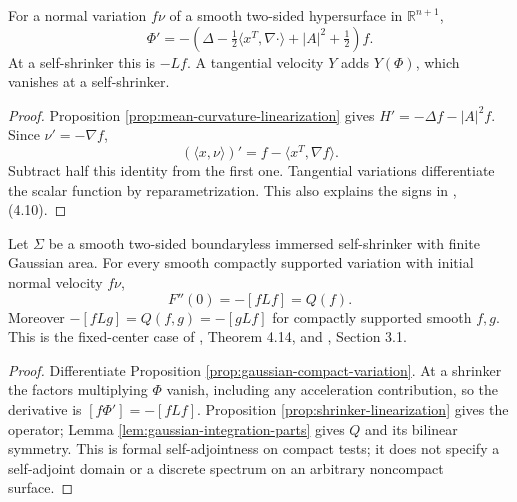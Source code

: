 \begin{proposition}\label{prop:shrinker-linearization}
For a normal variation $f\nu$ of a smooth two-sided hypersurface in $\mathbb R^{n+1}$,
\[
 \Phi'= -\left(\Delta-\tfrac12\langle x^T,\nabla\cdot\rangle+|A|^2+\tfrac12\right)f.
\]
At a self-shrinker this is $-Lf$. A tangential velocity $Y$ adds $Y(\Phi)$, which vanishes at a self-shrinker.
\end{proposition}
\begin{proof}
Proposition \ref{prop:mean-curvature-linearization} gives $H'=-\Delta f-|A|^2f$. Since $\nu'=-\nabla f$,
\[
 (\langle x,\nu\rangle)'=f-\langle x^T,\nabla f\rangle.
\]
Subtract half this identity from the first one. Tangential variations differentiate the scalar function by reparametrization. This also explains the signs in \cite{CM12}, (4.10).
\end{proof}

\begin{theorem}\label{thm:shrinker-fixed-hessian}
Let $\Sigma$ be a smooth two-sided boundaryless immersed self-shrinker with finite Gaussian area. For every smooth compactly supported variation with initial normal velocity $f\nu$,
\[
 F''(0)=-[fLf]=Q(f).
\]
Moreover $-[fLg]=Q(f,g)=-[gLf]$ for compactly supported smooth $f,g$. This is the fixed-center case of \cite{CM12}, Theorem 4.14, and \cite{CCMS20}, Section 3.1.
\end{theorem}
\begin{proof}
Differentiate Proposition \ref{prop:gaussian-compact-variation}. At a shrinker the factors multiplying $\Phi$ vanish, including any acceleration contribution, so the derivative is $[f\Phi']=-[fLf]$. Proposition \ref{prop:shrinker-linearization} gives the operator; Lemma \ref{lem:gaussian-integration-parts} gives $Q$ and its bilinear symmetry. This is formal self-adjointness on compact tests; it does not specify a self-adjoint domain or a discrete spectrum on an arbitrary noncompact surface.
\end{proof}

